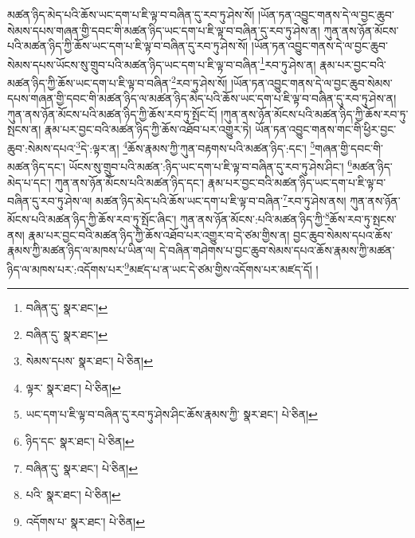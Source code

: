 མཚན་ཉིད་མེད་པའི་ཆོས་ཡང་དག་པ་ཇི་ལྟ་བ་བཞིན་དུ་རབ་ཏུ་ཤེས་སོ། །ཡོན་ཏན་འབྱུང་གནས་དེ་ལ་བྱང་ཆུབ་སེམས་དཔས་གཞན་གྱི་དབང་གི་མཚན་ཉིད་ཡང་དག་པ་ཇི་ལྟ་བ་བཞིན་དུ་རབ་ཏུ་ཤེས་ན། ཀུན་ནས་ཉོན་མོངས་པའི་མཚན་ཉིད་ཀྱི་ཆོས་ཡང་དག་པ་ཇི་ལྟ་བ་བཞིན་དུ་རབ་ཏུ་ཤེས་སོ། །ཡོན་ཏན་འབྱུང་གནས་དེ་ལ་བྱང་ཆུབ་སེམས་དཔས་ཡོངས་སུ་གྲུབ་པའི་མཚན་ཉིད་ཡང་དག་པ་ཇི་ལྟ་བ་བཞིན་\footnote{བཞིན་དུ་  སྣར་ཐང་། }རབ་ཏུ་ཤེས་ན། རྣམ་པར་བྱང་བའི་མཚན་ཉིད་ཀྱི་ཆོས་ཡང་དག་པ་ཇི་ལྟ་བ་བཞིན་\footnote{བཞིན་དུ་  སྣར་ཐང་། }རབ་ཏུ་ཤེས་སོ། །ཡོན་ཏན་འབྱུང་གནས་དེ་ལ་བྱང་ཆུབ་སེམས་དཔས་གཞན་གྱི་དབང་གི་མཚན་ཉིད་ལ་མཚན་ཉིད་མེད་པའི་ཆོས་ཡང་དག་པ་ཇི་ལྟ་བ་བཞིན་དུ་རབ་ཏུ་ཤེས་ན། ཀུན་ནས་ཉོན་མོངས་པའི་མཚན་ཉིད་ཀྱི་ཆོས་རབ་ཏུ་སྤོང་ངོ། །ཀུན་ནས་ཉོན་མོངས་པའི་མཚན་ཉིད་ཀྱི་ཆོས་རབ་ཏུ་སྤངས་ན། རྣམ་པར་བྱང་བའི་མཚན་ཉིད་ཀྱི་ཆོས་འཐོབ་པར་འགྱུར་ཏེ། ཡོན་ཏན་འབྱུང་གནས་གང་གི་ཕྱིར་བྱང་ཆུབ་:སེམས་དཔའ་\footnote{སེམས་དཔས་  སྣར་ཐང་།  པེ་ཅིན། }དེ་:ལྟར་ན། \footnote{ལྟར་  སྣར་ཐང་།  པེ་ཅིན། }ཆོས་རྣམས་ཀྱི་ཀུན་བརྟགས་པའི་མཚན་ཉིད་:དང་། \footnote{ཡང་དག་པ་ཇི་ལྟ་བ་བཞིན་དུ་རབ་ཏུ་ཤེས་ཤིང་ཆོས་རྣམས་ཀྱི་  སྣར་ཐང་།  པེ་ཅིན། }གཞན་གྱི་དབང་གི་མཚན་ཉིད་དང་། ཡོངས་སུ་གྲུབ་པའི་མཚན་:ཉིད་ཡང་དག་པ་ཇི་ལྟ་བ་བཞིན་དུ་རབ་ཏུ་ཤེས་ཤིང་། \footnote{ཉིད་དང་  སྣར་ཐང་།  པེ་ཅིན། }མཚན་ཉིད་མེད་པ་དང་། ཀུན་ནས་ཉོན་མོངས་པའི་མཚན་ཉིད་དང་། རྣམ་པར་བྱང་བའི་མཚན་ཉིད་ཡང་དག་པ་ཇི་ལྟ་བ་བཞིན་དུ་རབ་ཏུ་ཤེས་ལ། མཚན་ཉིད་མེད་པའི་ཆོས་ཡང་དག་པ་ཇི་ལྟ་བ་བཞིན་\footnote{བཞིན་དུ་  སྣར་ཐང་།  པེ་ཅིན། }རབ་ཏུ་ཤེས་ནས། ཀུན་ནས་ཉོན་མོངས་པའི་མཚན་ཉིད་ཀྱི་ཆོས་རབ་ཏུ་སྤོང་ཞིང་། ཀུན་ནས་ཉོན་མོངས་:པའི་མཚན་ཉིད་ཀྱི་\footnote{པའི་  སྣར་ཐང་།  པེ་ཅིན། }ཆོས་རབ་ཏུ་སྤངས་ནས། རྣམ་པར་བྱང་བའི་མཚན་ཉིད་ཀྱི་ཆོས་འཐོབ་པར་འགྱུར་བ་དེ་ཙམ་གྱིས་ན། བྱང་ཆུབ་སེམས་དཔའ་ཆོས་རྣམས་ཀྱི་མཚན་ཉིད་ལ་མཁས་པ་ཡིན་ལ། དེ་བཞིན་གཤེགས་པ་བྱང་ཆུབ་སེམས་དཔའ་ཆོས་རྣམས་ཀྱི་མཚན་ཉིད་ལ་མཁས་པར་:འདོགས་པར་\footnote{འདོགས་པ་  སྣར་ཐང་།  པེ་ཅིན། }མཛད་པ་ན་ཡང་དེ་ཙམ་གྱིས་འདོགས་པར་མཛད་དོ། །

